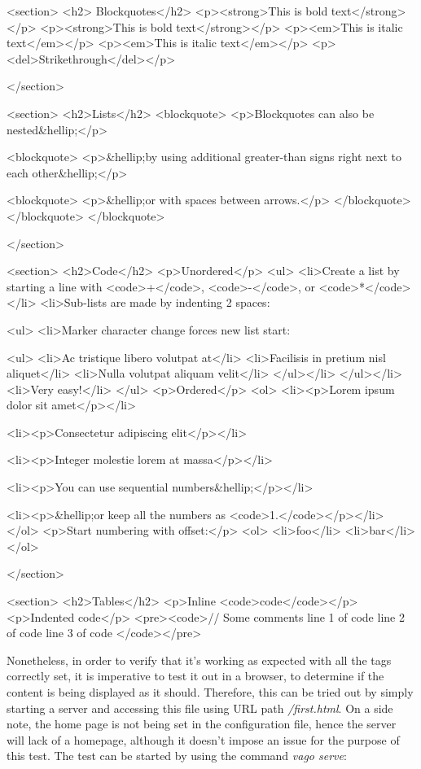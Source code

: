 \begin{code}
<section>
<h2>
    Blockquotes</h2>
    <p><strong>This is bold text</strong></p>
    <p><strong>This is bold text</strong></p>
    <p><em>This is italic text</em></p>
    <p><em>This is italic text</em></p>
    <p><del>Strikethrough</del></p>

    </section>



    <section>
    <h2>Lists</h2>
    <blockquote>
    <p>Blockquotes can also be nested&hellip;</p>

    <blockquote>
    <p>&hellip;by using additional greater-than signs right next to each other&hellip;</p>

    <blockquote>
    <p>&hellip;or with spaces between arrows.</p>
    </blockquote>
    </blockquote>
    </blockquote>

    </section>



    <section>
    <h2>Code</h2>
    <p>Unordered</p>
    <ul>
    <li>Create a list by starting a line with <code>+</code>, <code>-</code>, or <code>*</code></li>
    <li>Sub-lists are made by indenting 2 spaces:

    <ul>
    <li>Marker character change forces new list start:

    <ul>
    <li>Ac tristique libero volutpat at</li>
    <li>Facilisis in pretium nisl aliquet</li>
    <li>Nulla volutpat aliquam velit</li>
    </ul></li>
    </ul></li>
    <li>Very easy!</li>
    </ul>
    <p>Ordered</p>
    <ol>
    <li><p>Lorem ipsum dolor sit amet</p></li>

    <li><p>Consectetur adipiscing elit</p></li>

    <li><p>Integer molestie lorem at massa</p></li>

    <li><p>You can use sequential numbers&hellip;</p></li>

    <li><p>&hellip;or keep all the numbers as <code>1.</code></p></li>
    </ol>
    <p>Start numbering with offset:</p>
    <ol>
    <li>foo</li>
    <li>bar</li>
    </ol>

    </section>



    <section>
    <h2>Tables</h2>
    <p>Inline <code>code</code></p>
    <p>Indented code</p>
    <pre><code>// Some comments
    line 1 of code
    line 2 of code
    line 3 of code
    </code></pre>
\end{code}


Nonetheless, in order to verify that it's working as expected with all the tags correctly set, it is imperative to test
it out in a browser, to determine if the content is being displayed as it should.
Therefore, this can be tried out by simply starting a server and accessing this file using URL path \emph{/first.html}.
On a side note, the home page is not being set in the configuration file, hence the server will lack of a homepage,
although it doesn't impose an issue for the purpose of this test.
The test can be started by using the command \emph{vago serve}:

